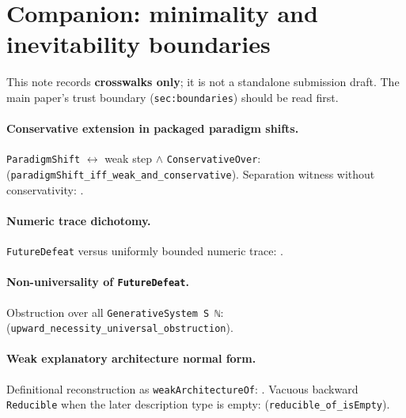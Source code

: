 \documentclass[11pt]{article}
\begin{document}
\section*{Companion: minimality and inevitability boundaries}

This note records \textbf{crosswalks only}; it is not a standalone submission draft.
The main paper's trust boundary (\texttt{sec:boundaries}) should be read first.

\paragraph{Conservative extension in packaged paradigm shifts.}
\texttt{ParadigmShift} \(\leftrightarrow\) weak step \(\land\) \texttt{ConservativeOver}:
 (\texttt{paradigmShift\_iff\_weak\_and\_conservative}).
Separation witness without conservativity:
.

\paragraph{Numeric trace dichotomy.}
\texttt{FutureDefeat} versus uniformly bounded numeric trace:
.

\paragraph{Non-universality of \texttt{FutureDefeat}.}
Obstruction over all \texttt{GenerativeSystem S ℕ}:
(\texttt{upward\_necessity\_universal\_obstruction}).

\paragraph{Weak explanatory architecture normal form.}
Definitional reconstruction as \texttt{weakArchitectureOf}:
.
Vacuous backward \texttt{Reducible} when the later description type is empty:
 (\texttt{reducible\_of\_isEmpty}).
\end{document}
